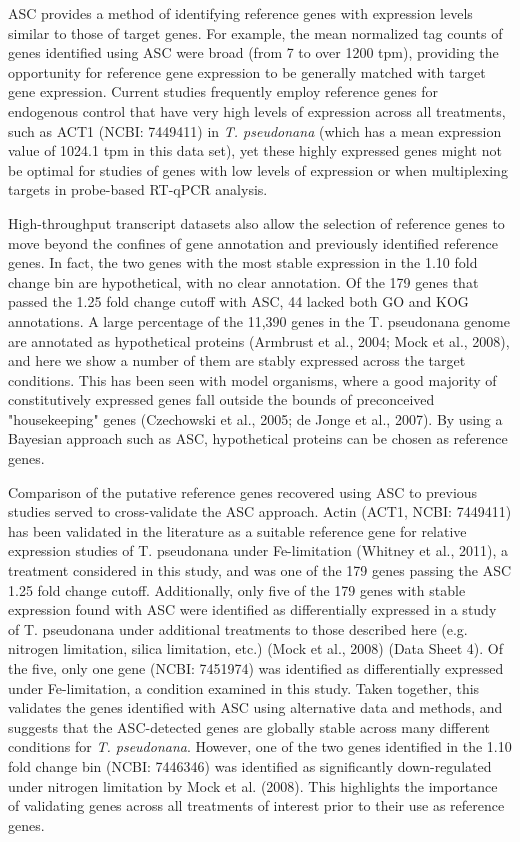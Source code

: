 	ASC provides a method of identifying reference genes with expression levels similar to those of target genes. For example, the mean normalized tag counts of genes identified using ASC were broad (from 7 to over 1200 tpm), providing the opportunity for reference gene expression to be generally matched with target gene expression. Current studies frequently employ reference genes for endogenous control that have very high levels of expression across all treatments, such as ACT1 (NCBI: 7449411) in \textit{T. pseudonana} (which has a mean expression value of 1024.1 tpm in this data set), yet these highly expressed genes might not be optimal for studies of genes with low levels of expression or when multiplexing targets in probe-based RT-qPCR analysis. \par
	High-throughput transcript datasets also allow the selection of reference genes to move beyond the confines of gene annotation and previously identified reference genes. In fact, the two genes with the most stable expression in the 1.10 fold change bin are hypothetical, with no clear annotation. Of the 179 genes that passed the 1.25 fold change cutoff with ASC, 44 lacked both GO and KOG annotations. A large percentage of the 11,390 genes in the T. pseudonana genome are annotated as hypothetical proteins (Armbrust et al., 2004; Mock et al., 2008), and here we show a number of them are stably expressed across the target conditions. This has been seen with model organisms, where a good majority of constitutively expressed genes fall outside the bounds of preconceived "housekeeping" genes (Czechowski et al., 2005; de Jonge et al., 2007). By using a Bayesian approach such as ASC, hypothetical proteins can be chosen as reference genes. \par
	Comparison of the putative reference genes recovered using ASC to previous studies served to cross-validate the ASC approach. Actin (ACT1, NCBI: 7449411) has been validated in the literature as a suitable reference gene for relative expression studies of T. pseudonana under Fe-limitation (Whitney et al., 2011), a treatment considered in this study, and was one of the 179 genes passing the ASC 1.25 fold change cutoff. Additionally, only five of the 179 genes with stable expression found with ASC were identified as differentially expressed in a study of T. pseudonana under additional treatments to those described here (e.g. nitrogen limitation, silica limitation, etc.) (Mock et al., 2008) (Data Sheet 4). Of the five, only one gene (NCBI: 7451974) was identified as differentially expressed under Fe-limitation, a condition examined in this study. Taken together, this validates the genes identified with ASC using alternative data and methods, and suggests that the ASC-detected genes are globally stable across many different conditions for \textit{T. pseudonana}. However, one of the two genes identified in the 1.10 fold change bin (NCBI: 7446346) was identified as significantly down-regulated under nitrogen limitation by Mock et al. (2008). This highlights the importance of validating genes across all treatments of interest prior to their use as reference genes. \par

